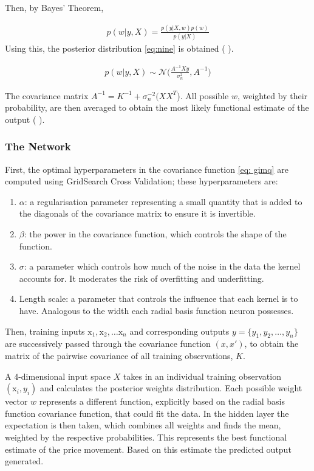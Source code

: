 \documentclass[11pt,a4paper]{article}
\newcommand{\citeboth}[1]{\citeauthor{#1} \citep{#1}}
\begin{document}
Then, by Bayes' Theorem, 

\begin{align}
    p(w|y, X) = \frac{p(y|X,w) p(w)}{p(y|X)} \label{eq: post}
\end{align}
Using this, the posterior distribution \eqref{eq:nine} is obtained (\citeboth{rasmussen2006}).

\begin{align}
    p(w|y, X) \sim \mathcal{N}\bigl(\frac{A^{-1}Xy}{\sigma_{n}^{2}}, A^{-1}\bigr) \label{eq:nine}
\end{align}

The covariance matrix $A^{-1} = K^{-1} + \sigma_{n}^{-2}(XX^T$).
All possible $w$, weighted by their probability, are then averaged to obtain the
most likely functional estimate of the output (\citeboth{rasmussen2006}).

\subsubsection{The Network}


First, the optimal hyperparameters in the covariance function \eqref{eq: gimq} 
are computed using GridSearch Cross Validation; these hyperparameters are:
\begin{enumerate}
    \item $\alpha$: a regularisation parameter representing a small quantity
    that is added to the diagonals of the covariance matrix to ensure it is 
    invertible. 
    \item $\beta$: the power in the covariance function, which controls the shape of the function.
    \item $\sigma$: a parameter which controls how much of the noise in the data the kernel accounts for. It moderates the risk of overfitting and underfitting.
    \item Length scale: a parameter that controls the influence that each kernel is to have. Analogous to 
    the width each radial basis function neuron possesses.
\end{enumerate}

Then, training inputs $\boldsymbol{\mathrm{x}}_1, \boldsymbol{\mathrm{x}}_2,\ldots \boldsymbol{\mathrm{x}}_{n}$
and corresponding outputs \( y = \{y_1, y_2, \dots, y_n\} \) are successively passed through the 
covariance function $(x,x')$, to obtain the matrix of the pairwise covariance of 
all training observations, $K$.

A $4$-dimensional input space $X$ takes in an individual training observation $(\boldsymbol{\mathrm{x}}_{i}, y_i)$ and 
calculates the posterior weights distribution. 
Each possible weight vector $w$ represents a different function, explicitly 
based on the radial basis function covariance function, that could fit the data. In the 
hidden layer the expectation is then taken, which
combines all weights and finds the mean, weighted by the 
respective probabilities. This represents the best functional estimate of the price movement. Based on this estimate 
the predicted output generated.
\end{document}
